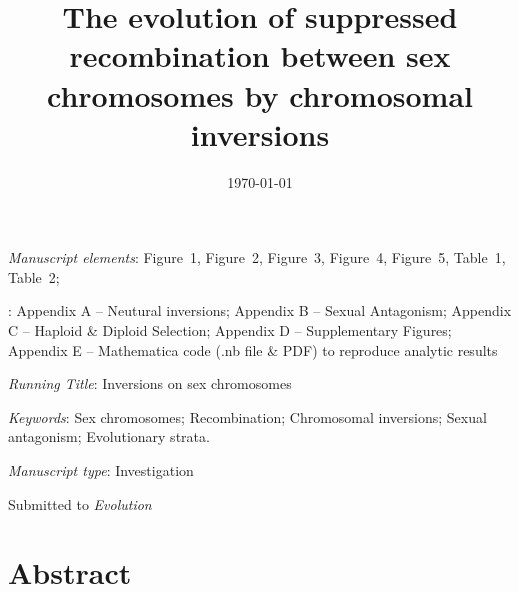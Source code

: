 \documentclass{article}[12pt]
\title{The evolution of suppressed recombination between sex chromosomes by chromosomal inversions}
\date{}
\begin{document}
\maketitle



\bigskip

\noindent \textit{Manuscript elements}: Figure~1, Figure~2, Figure~3, Figure~4, Figure~5, Table~1, Table~2;

: Appendix A -- Neutural inversions; Appendix B -- Sexual Antagonism; Appendix C -- Haploid \& Diploid Selection; Appendix D -- Supplementary Figures; Appendix E -- Mathematica code (.nb file \& PDF) to reproduce analytic results

\bigskip
\noindent{} \textit{Running Title}: Inversions on sex chromosomes

\bigskip

\noindent{} \textit{Keywords}: Sex chromosomes; Recombination; Chromosomal inversions; Sexual antagonism; Evolutionary strata.

\bigskip

\noindent{} \textit{Manuscript type}: Investigation

\bigskip

\begin{center} 
	Submitted to {\itshape Evolution} \date{\today}
\end{center}

\linenumbers
\modulolinenumbers[1]
\renewcommand\linenumberfont{\normalfont\small}


\newpage{}
\section*{Abstract}%
\end{document}

